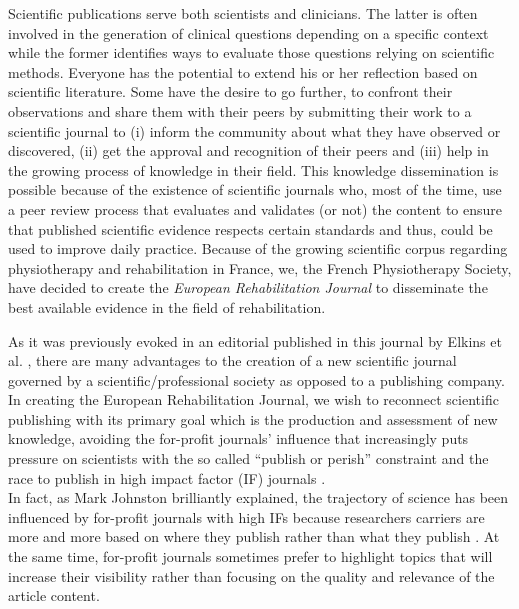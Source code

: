 Scientific publications serve both scientists and clinicians. The latter is often involved in the generation of clinical questions depending on a specific context while the former identifies ways to evaluate those questions relying on scientific methods. Everyone has the potential to extend his or her reflection based on scientific literature. Some have the desire to go further, to confront their observations and share them with their peers by submitting their work to a scientific journal to (i) inform the community about what they have observed or discovered, (ii) get the approval and recognition of their peers and (iii) help in the growing process of knowledge in their field. This knowledge dissemination is possible because of the existence of scientific journals who, most of the time, use a peer review process that evaluates and validates (or not) the content to ensure that published scientific evidence respects certain standards and thus, could be used to improve daily practice. Because of the growing scientific corpus regarding physiotherapy and rehabilitation in France, we, the French Physiotherapy Society, have decided to create the \textit{European Rehabilitation Journal} to disseminate the best available evidence in the field of rehabilitation.


As it was previously evoked in an editorial published in this journal by Elkins et al. \citep{elkins2021new}, there are many advantages to the creation of a new scientific journal governed by a scientific/professional society as opposed to a publishing company. In creating the European Rehabilitation Journal, we wish to reconnect scientific publishing with its primary goal which is the production and assessment of new knowledge, avoiding the for-profit journals’ influence that increasingly puts pressure on scientists with the so called “publish or perish” constraint and the race to publish in high impact factor (IF) journals \citep{schloss2017support}.\\

In fact, as Mark Johnston brilliantly explained, the trajectory of science has been influenced by for-profit journals with high IFs because researchers carriers are more and more based on where they publish rather than what they publish \citep{johnston2017scientific}. At the same time, for-profit journals sometimes prefer to highlight topics that will increase their visibility rather than focusing on the quality and relevance of the article content.
\\ 


